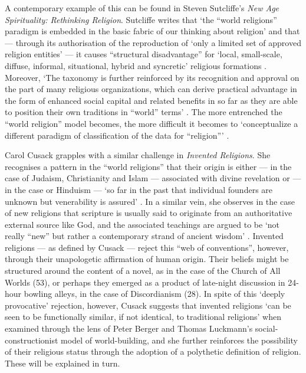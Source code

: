 \documentclass[Draft.tex]{subfiles}
\begin{document}
A contemporary example of this can be found in Steven Sutcliffe's
\textit{New Age Spirituality: Rethinking Religion}.
Sutcliffe writes that `the ``world religions'' paradigm is embedded in the
basic fabric of our thinking about religion' and that --- through its
authorisation of the reproduction of `only a limited set
of approved religion entities' --- it causes ``structural disadvantage'' for
`local, small-scale, diffuse, informal, situational, hybrid and syncretic'
religious formations \parencite[22, 25]{Sutcliffe14}.
Moreover, `The taxonomy is further reinforced by
its recognition and approval on the part of many religious organizations,
which can derive practical advantage in the form of enhanced social capital
and related benefits in so far as they are able to position
their own traditions in ``world'' terms' \parencite[23]{Sutcliffe14}.
The more entrenched the ``world religion'' model becomes,
the more difficult it becomes to `conceptualize a different paradigm
of classification of the data for ``religion''\thinspace'
\parencite[25]{Sutcliffe14}.

Carol Cusack grapples with a similar challenge in \textit{Invented Religions}.
She recognises a pattern in the ``world religions'' that their origin is
either --- in the case of Judaism, Christianity and Islam ---
associated with divine revelation or --- in the case or Hinduism ---
`so far in the past that individual founders are unknown but venerability is
assured' \parencite[1]{Cusack10}.
In a similar vein, she observes in the case of new religions that
scripture is usually said to originate from
an authoritative external source like God, and the associated teachings
are argued to be `not really ``new'' but rather a contemporary
strand of ancient wisdom' \parencite[1]{Cusack10}.
Invented religions --- as defined by Cusack --- reject this
``web of conventions'', however, through their unapologetic affirmation of
human origin.
Their beliefs might be structured around the content of a novel,
as in the case of the Church of All Worlds (53),
or perhaps they emerged as a product of late-night discussion in
24-hour bowling alleys, in the case of Discordianism (28).
In spite of this `deeply provocative' rejection,
however, Cusack suggests that invented religions `can be seen to be
functionally similar, if not identical, to traditional religions'
when examined through the lens of Peter Berger and Thomas Luckmann's
social-constructionist model of world-building, and she further reinforces
the possibility of their religious status through the adoption of a polythetic
definition of religion. These will be explained in turn.
\end{document}
